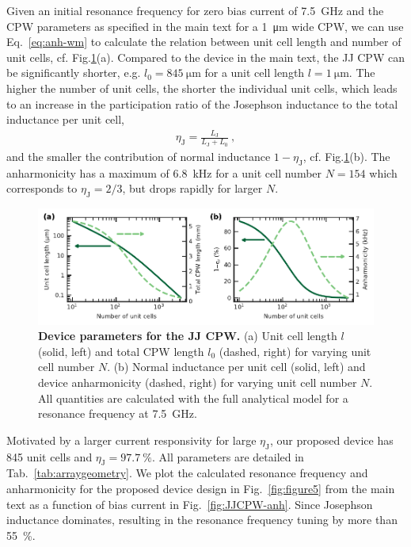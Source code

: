 Given an initial resonance frequency for zero bias current of \SI{7.5}{\giga\hertz} and the CPW parameters as specified in the main text for a \SI{1}{\micro\meter} wide CPW, we can use Eq.~\eqref{eq:anh-wm} to calculate the relation between unit cell length and number of unit cells, cf. Fig.\ref{fig:JJCPW}(a).
% 
Compared to the device in the main text, the JJ CPW can be significantly shorter, e.g. $l_0=\SI{845}{\micro\meter}$ for a unit cell length $l=\SI{1}{\micro\meter}$.
% 
The higher the number of unit cells, the shorter the individual unit cells, which leads to an increase in the participation ratio of the Josephson inductance to the total inductance per unit cell, 
% 
\begin{align}
\eta_\text{J} = \frac{L_\text{J}}{L_\text{J}+L_0} \ ,
\end{align}
% 
and the smaller the contribution of normal inductance $1-\eta_\text{J}$, cf. Fig.\ref{fig:JJCPW}(b).
% 
The anharmonicity has a maximum of \SI{6.8}{\kilo\hertz} for a unit cell number $N=154$ which corresponds to $\eta_\text{J}=2/3$, but drops rapidly for larger $N$.

\begin{figure}
	\centering
	\includegraphics[width=\linewidth]{chapter-currentdetection/figures/SM_JJarrayCPW_vs_N}
	\caption{
		\textbf{Device parameters for the JJ CPW.}
		(a) Unit cell length $l$ (solid, left) and total CPW length $l_0$ (dashed, right) for varying unit cell number $N$.
		(b) Normal inductance per unit cell (solid, left) and device anharmonicity (dashed, right) for varying unit cell number $N$.
		All quantities are calculated with the full analytical model for a resonance frequency at \SI{7.5}{\giga\hertz}.
	}
	\label{fig:JJCPW}
\end{figure}

Motivated by a larger current responsivity for large $\eta_\text{J}$, our proposed device has 845 unit cells and $\eta_\text{J}=\SI{97.7}{\percent}$.
% 
All parameters are detailed in Tab.~\ref{tab:arraygeometry}.
% 
We plot the calculated resonance frequency and anharmonicity for the proposed device design in Fig.~\ref{fig:figure5} from the main text as a function of bias current in Fig.~\ref{fig:JJCPW-anh}.
% 
Since Josephson inductance dominates, resulting in the resonance frequency tuning by more than \SI{55}{\percent}.

